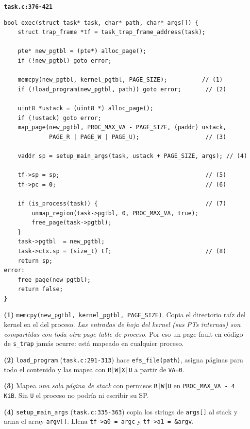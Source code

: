 \documentclass[11pt,a4paper]{article}
\begin{document}
\begin{walkthrough}
\textbf{\texttt{task.c:376-421}}

\begin{lstlisting}[style=cstyle]
bool exec(struct task* task, char* path, char* args[]) {
    struct trap_frame *tf = task_trap_frame_address(task);

    pte* new_pgtbl = (pte*) alloc_page();
    if (!new_pgtbl) goto error;

    memcpy(new_pgtbl, kernel_pgtbl, PAGE_SIZE);          // (1)
    if (!load_program(new_pgtbl, path)) goto error;       // (2)

    uint8 *ustack = (uint8 *) alloc_page();
    if (!ustack) goto error;
    map_page(new_pgtbl, PROC_MAX_VA - PAGE_SIZE, (paddr) ustack,
             PAGE_R | PAGE_W | PAGE_U);                   // (3)

    vaddr sp = setup_main_args(task, ustack + PAGE_SIZE, args); // (4)

    tf->sp = sp;                                          // (5)
    tf->pc = 0;                                           // (6)

    if (is_process(task)) {                               // (7)
        unmap_region(task->pgtbl, 0, PROC_MAX_VA, true);
        free_page(task->pgtbl);
    }
    task->pgtbl  = new_pgtbl;
    task->ctx.sp = (size_t) tf;                           // (8)
    return sp;
error:
    free_page(new_pgtbl);
    return false;
}
\end{lstlisting}

\textbf{(1)} \texttt{memcpy(new\_pgtbl, kernel\_pgtbl, PAGE\_SIZE)}.
Copia el directorio raíz del kernel en el del proceso. \emph{Las
entradas de hoja del kernel (sus PTs internas) son compartidas con
toda otra page table de proceso}. Por eso un page fault en código
de \texttt{s\_trap} jamás ocurre: está mapeado en cualquier proceso.

\textbf{(2)} \texttt{load\_program} (\texttt{task.c:291-313}) hace
\texttt{efs\_file(path)}, asigna páginas para todo el contenido y
las mapea con \texttt{R|W|X|U} a partir de \texttt{VA=0}.

\textbf{(3)} Mapea \emph{una sola página de stack} con permisos
\texttt{R|W|U} en \texttt{PROC\_MAX\_VA - 4\,KiB}. Sin \texttt{U}
el proceso no podría ni escribir su SP.

\textbf{(4)} \texttt{setup\_main\_args} (\texttt{task.c:335-363})
copia los strings de \texttt{args[]} al stack y arma el array
\texttt{argv[]}. Llena \texttt{tf->a0 = argc} y
\texttt{tf->a1 = \&argv}.


\end{walkthrough}
\end{document}
